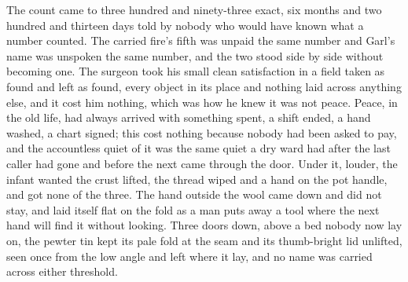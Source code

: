 The count came to three hundred and ninety-three exact, six months and two hundred and thirteen days told by nobody who would have known what a number counted. The carried fire's fifth was unpaid the same number and Garl's name was unspoken the same number, and the two stood side by side without becoming one. The surgeon took his small clean satisfaction in a field taken as found and left as found, every object in its place and nothing laid across anything else, and it cost him nothing, which was how he knew it was not peace. Peace, in the old life, had always arrived with something spent, a shift ended, a hand washed, a chart signed; this cost nothing because nobody had been asked to pay, and the accountless quiet of it was the same quiet a dry ward had after the last caller had gone and before the next came through the door. Under it, louder, the infant wanted the crust lifted, the thread wiped and a hand on the pot handle, and got none of the three. The hand outside the wool came down and did not stay, and laid itself flat on the fold as a man puts away a tool where the next hand will find it without looking. Three doors down, above a bed nobody now lay on, the pewter tin kept its pale fold at the seam and its thumb-bright lid unlifted, seen once from the low angle and left where it lay, and no name was carried across either threshold.
